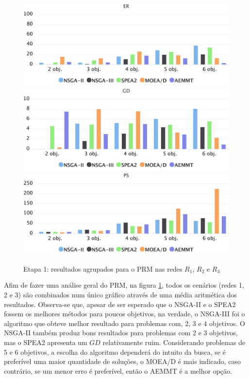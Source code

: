 \begin{figure}[!htbp]
	\caption{Etapa 1: resultados agrupados para o PRM nas redes $R_1$, $R_2$ e $R_3$}
	\label{fig_exp1_mrp_todos}
	\includegraphics[width=1\textwidth]{cap_experimentos/figs/etapa1/er-mrp-todos}
	\includegraphics[width=1\textwidth]{cap_experimentos/figs/etapa1/gd-mrp-todos}
	\includegraphics[width=1\textwidth]{cap_experimentos/figs/etapa1/ps-mrp-todos}
\end{figure}

Afim de fazer uma análise geral do PRM, na figura \ref{fig_exp1_mrp_todos}, todos os cenários (redes 1, 2 e 3) são combinados num único gráfico através de uma média aritmética dos resultados. Observa-se que, apesar de ser esperado que o NSGA-II e o SPEA2 fossem os melhores métodos para poucos objetivos, na verdade, o NSGA-III foi o algoritmo que obteve melhor resultado para problemas com, 2, 3 e 4 objetivos. O NSGA-II também produz bons resultados para problemas com 2 e 3 objetivos, mas o SPEA2 apresenta um $GD$ relativamente ruim. Considerando problemas de 5 e 6 objetivos, a escolha do algoritmo dependerá do intuito da busca, se é preferível uma maior quantidade de soluções, o MOEA/D é mais indicado, caso contrário, se um menor erro é preferível, então o AEMMT é a melhor opção.

